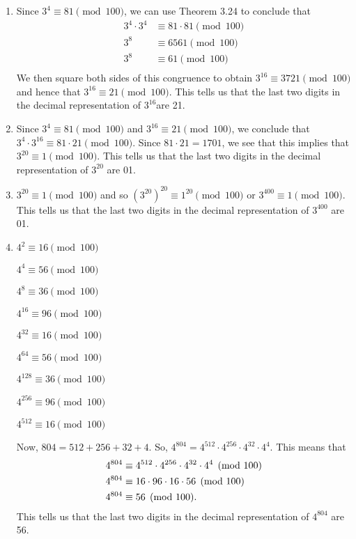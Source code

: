 \documentclass[11pt]{article}
\begin{document}
\begin{enumerate}
\item Since  $3^4  \equiv 81 \pmod{100}$, we can use Theorem 3.24 to conclude that
\[
\begin{aligned}
  3^4  \cdot 3^4  &\equiv 81 \cdot 81 \pmod{100} \\ 
  3^8  &\equiv 6561 \pmod{100} \\ 
  3^8  &\equiv 61 \pmod{100} \\ 
\end{aligned}
\]
We then square both sides of this congruence to obtain  
$3^{16}  \equiv 3721 \pmod{100}$ and hence that  $3^{16}  \equiv 21 \pmod{100}$.  This tells us that the last two digits in the decimal representation of  $3^{16} $are  21.

\item Since  $3^4  \equiv 81 \pmod{100}$ and  $3^{16}  \equiv 21 \pmod{100}$, we conclude that  
$3^4  \cdot 3^{16}  \equiv 81 \cdot 21 \pmod{100}$. Since  $81 \cdot 21 = 1701$, we see that this implies that  $3^{20}  \equiv 1 \pmod{100}$. This tells us that the last two digits in the decimal representation of  $3^{20} $ are  01.

\item $3^{20}  \equiv 1 \pmod{100}$ and so  
$\left( {3^{20} } \right)^{20}  \equiv 1^{20} \pmod{100}$  or  
$3^{400}  \equiv 1 \pmod{100}$. This tells us that the last two digits in the decimal representation of  $3^{400} $ are  01.

\item \begin{multicols}{3}
$4^2  \equiv 16 \pmod{100}$

$4^4  \equiv 56 \pmod{100}$

$4^8  \equiv 36 \pmod{100}$

$4^{16}  \equiv 96 \pmod{100}$

$4^{32}  \equiv 16 \pmod{100}$

$4^{64}  \equiv 56 \pmod{100}$

$4^{128}  \equiv 36 \pmod{100}$

$4^{256}  \equiv 96 \pmod{100}$

$4^{512}  \equiv 16 \pmod{100}$

\end{multicols}
Now,  $804 = 512 + 256 + 32 + 4$.  So,  
$4^{804}  = 4^{512}  \cdot 4^{256}  \cdot 4^{32}  \cdot 4^4 $.  This means that
\begin{align*}
  4^{804}  &\equiv 4^{512}  \cdot 4^{256}  \cdot 4^{32}  \cdot 4^4  \pmod{100} \hfill \\
  4^{804}  &\equiv 16 \cdot 96 \cdot 16 \cdot 56 \pmod{100} \hfill \\
  4^{804}  &\equiv 56 \pmod{100}. 
\end{align*}
This tells us that the last two digits in the decimal representation of  $4^{804} $
 are  56.


\end{enumerate}
\end{document}
